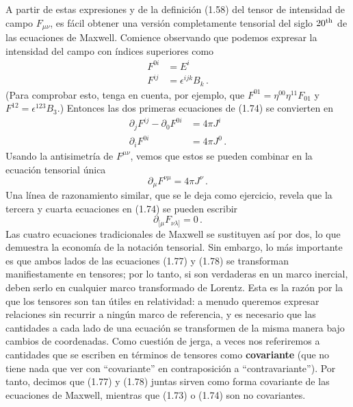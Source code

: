 \documentclass[11pt,b5paper,openany,twoside]{book}
\newcommand{\mn}{{\mu\nu}}
\newcommand{\p}[1]{{\partial_{#1}}}
\begin{document}
A partir de estas expresiones y de la definición (1.58) del tensor de intensidad de campo $F_{\mu\nu}$, es fácil obtener una versión completamente tensorial del siglo $20^{\rm th}$ de las ecuaciones de Maxwell.
Comience observando que podemos expresar la intensidad del campo con índices superiores como
\begin{align}
F^{0i} &= E^i\nonumber \\ F^{ij} &= \epsilon^{ijk}B_k\,. \label{1.75}
\end{align}
(Para comprobar esto, tenga en cuenta, por ejemplo, que $F^{01} = \eta^{00}\eta^{11} F_{01}$ y $F^{12} = \epsilon^{123}B_3$.)
Entonces las dos primeras ecuaciones de (1.74) se convierten en
\begin{align}
\p{j}F^{ij} - \p0 F^{0i} &= 4\pi J^i\nonumber \\
\p{i}F^{0i} &= 4\pi J^0\,. \label{1.76}
\end{align}
Usando la antisimetría de $F^{\mn}$, vemos que estos se pueden combinar en la ecuación tensorial única
\begin{equation}
\p\mu F^{\nu\mu} = 4\pi J^\nu\,.\label{1.77}
\end{equation}
Una línea de razonamiento similar, que se le deja como ejercicio, revela que la tercera y cuarta ecuaciones en (1.74) se pueden escribir
\begin{equation}
\p{[\mu} F_{\nu\lambda]}= 0\,.\label{1.78}
\end{equation}
Las cuatro ecuaciones tradicionales de Maxwell se sustituyen así por dos, lo que demuestra la economía de la notación tensorial.
Sin embargo, lo más importante es que ambos lados de las ecuaciones (1.77) y (1.78) se transforman manifiestamente en tensores; por lo tanto, si son verdaderas en un marco inercial, deben serlo en cualquier marco transformado de Lorentz.
Esta es la razón por la que los tensores son tan útiles en relatividad: a menudo queremos expresar relaciones sin recurrir a ningún marco de referencia, y es necesario que las cantidades a cada lado de una ecuación se transformen de la misma manera bajo cambios de coordenadas.
Como cuestión de jerga, a veces nos referiremos a cantidades que se escriben en términos de tensores como {\bf covariante} (que no tiene nada que ver con ``covariante'' en contraposición a ``contravariante'').
Por tanto, decimos que (1.77) y (1.78) juntas sirven como forma covariante de las ecuaciones de Maxwell, mientras que (1.73) o (1.74) son no covariantes.
\end{document}
